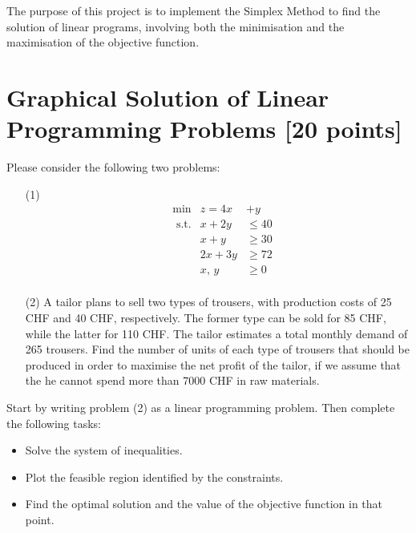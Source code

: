 \documentclass[unicode,11pt,a4paper,oneside,numbers=endperiod,openany]{scrartcl}
\begin{document}
\setassignment
{}

\newline

\assignmentpolicy


The purpose of this project is to implement the Simplex Method to find the solution of linear programs, involving both the minimisation and the maximisation of the objective function.

\section{Graphical Solution of Linear Programming Problems [20 points]}
Please consider the following two problems:
\begin{enumerate}
	\item[(1)] \begin{equation*}
		\begin{aligned}
		& \text{min}  &  z=4x&+y\\
		& \text{ s.t.} &  x+2y &\leq 40 \\
		& &   x+y &\geq 30\\
		& &   2x+3y &\geq 72 \\
		& &  x,\,y &\geq0 \\
		\end{aligned}
		\end{equation*}
	\item[(2)] A tailor plans to sell two types of trousers, with production costs of 25 CHF and 40 CHF, respectively. The former type can be sold for 85 CHF, while the latter for 110 CHF. The tailor estimates a total monthly demand of 265 trousers. Find the number of units of each type of trousers that should be produced in order to maximise the net profit of the tailor, if we assume that the he cannot spend more than 7000 CHF in raw materials.
\end{enumerate}
Start by writing problem (2) as a linear programming problem. Then complete the following tasks:
\begin{itemize}
	\item Solve the system of inequalities.
	\item Plot the feasible region identified by the constraints.
	\item Find the optimal solution and the value of the objective function in that point.
\end{itemize}
\end{document}
